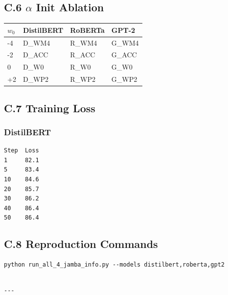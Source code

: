 \subsection{C.6 $\alpha$ Init Ablation}

\begin{table}[H]
\centering
\small
\begin{tabular}{llll}
\toprule
\textbf{$w_0$} & \textbf{DistilBERT} & \textbf{RoBERTa} & \textbf{GPT-2} \\
\midrule
-4 & {{D\_WM4}} & {{R\_WM4}} & {{G\_WM4}} \\
-2 & {{D\_ACC}} & {{R\_ACC}} & {{G\_ACC}} \\
0 & {{D\_W0}} & {{R\_W0}} & {{G\_W0}} \\
+2 & {{D\_WP2}} & {{R\_WP2}} & {{G\_WP2}} \\
\bottomrule
\end{tabular}
\end{table}

\subsection{C.7 Training Loss}

\subsubsection{DistilBERT}
\begin{lstlisting}
Step  Loss
1     82.1
5     83.4
10    84.6
20    85.7
30    86.2
40    86.4
50    86.4
\end{lstlisting}

\subsection{C.8 Reproduction Commands}

\begin{lstlisting}
python run_all_4_jamba_info.py --models distilbert,roberta,gpt2
\end{lstlisting}
\begin{lstlisting}

---
\end{lstlisting}
